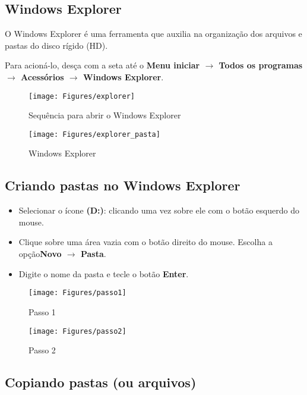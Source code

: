 \documentclass[hidelinks,12pt]{article}
\begin{document}
	\subsection{Windows Explorer}

		O Windows Explorer é uma ferramenta que auxilia na organização dos arquivos e pastas do disco rígido (HD).


		Para acioná-lo, desça com a seta até o {\bf Menu iniciar $\rightarrow$ Todos os programas $\rightarrow$ Acessórios $\rightarrow$ Windows Explorer}.


		\begin{figure}[!h]
			\centering
			\texttt{[image: Figures/explorer]}
			\caption{Sequência para abrir o Windows Explorer}
			\label{fig:explorer}
		\end{figure}


		\begin{figure}[!h]
			\centering
			\texttt{[image: Figures/explorer\_pasta]}
			\caption{Windows Explorer}
			\label{fig:explorer_p}
		\end{figure}

		\newpage
		\subsection{Criando pastas no Windows Explorer}

		\begin{itemize}

			\item Selecionar o ícone {\bf(D:)}: clicando uma vez sobre ele com o botão esquerdo do mouse.
			\item Clique sobre uma área vazia com o botão direito do mouse. Escolha a opção{\bf Novo $\rightarrow$ Pasta}.

			\item Digite o nome da pasta e tecle o botão {\bf Enter}.
		\end{itemize}

		\begin{figure}[!h]
			\centering
			\texttt{[image: Figures/passo1]}
			\caption{Passo 1}
			\label{fig:passo1}
		\end{figure}


		\begin{figure}[!h]
			\centering
			\texttt{[image: Figures/passo2]}
			\caption{Passo 2}
			\label{fig:passo2}
		\end{figure}

		\newpage
		\subsection{Copiando pastas (ou arquivos)}
\end{document}
